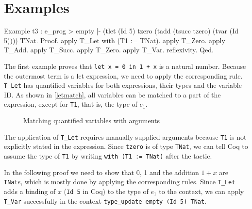 \documentclass[fleqn, abstract=on]{scrreprt}
\newcommand{\coqinline}[1]{\texttt{#1}}
\begin{document}
\section{Examples}
\begin{coqcode}
Example t3 : e_prog > empty |- (tlet (Id 5) tzero 
                                     (tadd (tsucc tzero) 
                                           (tvar (Id 5)))) \in TNat.
Proof. 
  apply T_Let with (T1 := TNat).
  apply T_Zero.
  apply T_Add.
  apply T_Succ. apply T_Zero.
  apply T_Var. reflexivity.
Qed.
\end{coqcode}
The first example proves that \texttt{let x = 0 in 1 + x} is a natural number. Because the outermost term is a let expression, we need to apply the corresponding rule. \coqinline{T_Let} has quantified variables for both expressions, their types and the variable ID. As shown in \autoref{letmatch}, all variables can be matched to a part of the expression, except for \coqinline{T1}, that is, the type of $e_{1}$.
\begin{figure}[H]
	\caption{Matching quantified variables with arguments}
	\label{letmatch}
\end{figure}\noindent
The application of \coqinline{T_Let} requires manually supplied arguments because \coqinline{T1} is not explicitly stated in the expression. Since \coqinline{tzero} is of type \coqinline{TNat}, we can tell Coq to assume the type of \coqinline{T1} by writing \coqinline{with (T1 := TNat)} after the tactic.
\par
In the following proof we need to show that 0, 1 and the addition $1 + x$ are \coqinline{TNat}s, which is mostly done by applying the corresponding rules. Since \coqinline{T_Let} adds a binding of $x$ (\coqinline{Id 5} in Coq) to the type of $e_{1}$ to the context, we can apply \coqinline{T_Var} successfully in the context \coqinline{type_update empty (Id 5) TNat}.\\
\end{document}
